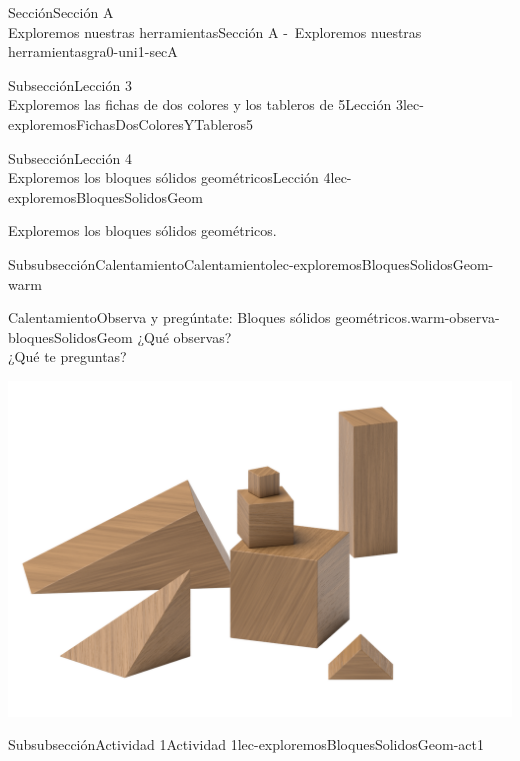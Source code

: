 \begin{sectionptx}{Sección}{{\Large Sección A\\}Exploremos nuestras herramientas}{}{Sección A -~Exploremos nuestras herramientas}{}{}{gra0-uni1-secA}
\begin{subsectionptx}{Subsección}{{\normalsize Lección 3\\[-0.05cm]}Exploremos las fichas de dos colores y los tableros de 5}{}{Lección 3}{}{}{lec-exploremosFichasDosColoresYTableros5}
\end{subsectionptx}
%
%
\typeout{************************************************}
\typeout{************************************************}
%
\begin{subsectionptx}{Subsección}{{\normalsize Lección 4\\[-0.05cm]}Exploremos los bloques sólidos geométricos}{}{Lección 4}{}{}{lec-exploremosBloquesSolidosGeom}
\begin{introduction}{}%
Exploremos los bloques sólidos geométricos.%
\end{introduction}%
%
%
\typeout{************************************************}
\typeout{************************************************}
%
\begin{subsubsectionptx}{Subsubsección}{Calentamiento}{}{Calentamiento}{}{}{lec-exploremosBloquesSolidosGeom-warm}
\begin{exploration}{Calentamiento}{Observa y pregúntate: Bloques sólidos geométricos.}{warm-observa-bloquesSolidosGeom}%
¿Qué observas?\\
 ¿Qué te preguntas?%
\begin{image}{0.0}{1}{0.0}{}%
\includegraphics[max width=\linewidth, center]{external/png-source/K.1.A Beta Student Workbook.Geoblocks.png}
\end{image}%
\end{exploration}%
\end{subsubsectionptx}
%
%
\typeout{************************************************}
\typeout{************************************************}
%
\begin{subsubsectionptx}{Subsubsección}{Actividad 1}{}{Actividad 1}{}{}{lec-exploremosBloquesSolidosGeom-act1}

\end{subsubsectionptx}
\end{subsectionptx}
\end{sectionptx}

